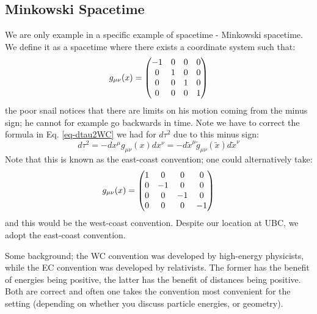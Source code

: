 \subsection{Minkowski Spacetime}
We are only example in a specific example of spacetime - Minkowski spacetime. We define it as a spacetime where there exists a coordinate system such that:
\begin{equation}
    g_{\mu\nu}(x) = \begin{pmatrix}-1& 0 & 0 & 0 \\ 0 & 1 & 0 & 0 \\ 0 & 0 & 1 & 0 \\ 0 & 0 & 0 & 1\end{pmatrix}
\end{equation}
the poor snail notices that there are limits on his motion coming from the minus sign; he cannot for example go backwards in time. Note we have to correct the formula in Eq. \eqref{eq-dtau2WC} we had for $d\tau^2$ due to this minus sign:
\begin{equation}
    d\tau^2 = -dx^\mu g_{\mu\nu}(x)dx^\nu = -d\tilde{x}^\mu \tilde{g}_{\mu\nu}(\tilde{x})d\tilde{x}^\nu
\end{equation}
Note that this is known as the east-coast convention; one could alternatively take:
\begin{equation}
    g_{\mu\nu}(x) = \begin{pmatrix}1& 0 & 0 & 0 \\ 0 & -1 & 0 & 0 \\ 0 & 0 & -1 & 0 \\ 0 & 0 & 0 & -1\end{pmatrix}
\end{equation}
and this would be the west-coast convention. Despite our location at UBC, we adopt the east-coast convention.

Some background; the WC convention was developed by high-energy physicists, while the EC convention was developed by relativists. The former has the benefit of energies being positive, the latter has the benefit of distances being positive. Both are correct and often one takes the convention most convenient for the setting (depending on whether you discuss particle energies, or geometry).

